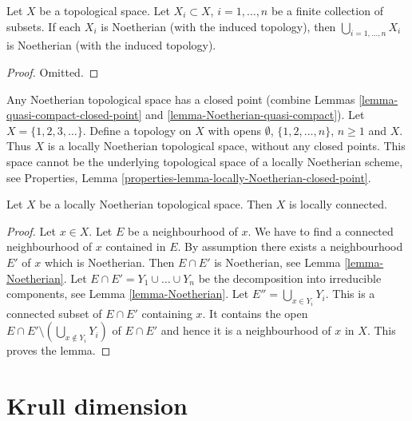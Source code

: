 \begin{lemma}
\label{lemma-finite-union-Noetherian}
Let $X$ be a topological space.
Let $X_i \subset X$, $i = 1, \ldots, n$ be a finite collection of subsets.
If each $X_i$ is Noetherian (with the induced topology), then
$\bigcup_{i = 1, \ldots, n}  X_i$ is Noetherian (with the induced topology).
\end{lemma}

\begin{proof}
Omitted.
\end{proof}

\begin{example}
\label{example-locally-Noetherian-no-closed-point}
Any Noetherian topological space has a closed point (combine
Lemmas \ref{lemma-quasi-compact-closed-point} and
\ref{lemma-Noetherian-quasi-compact}).
Let $X = \{1, 2, 3, \ldots \}$. Define a topology on $X$
with opens $\emptyset$, $\{1, 2, \ldots, n\}$, $n \geq 1$
and $X$. Thus $X$ is a locally Noetherian topological space,
without any closed points. This space cannot be the underlying
topological space of a locally Noetherian scheme, see
Properties, Lemma \ref{properties-lemma-locally-Noetherian-closed-point}.
\end{example}

\begin{lemma}
\label{lemma-locally-Noetherian-locally-connected}
Let $X$ be a locally Noetherian topological space.
Then $X$ is locally connected.
\end{lemma}

\begin{proof}
Let $x \in X$. Let $E$ be a neighbourhood of $x$.
We have to find a connected neighbourhood of $x$ contained
in $E$. By assumption there exists a neighbourhood $E'$ of $x$
which is Noetherian. Then $E \cap E'$ is Noetherian, see
Lemma \ref{lemma-Noetherian}.
Let $E \cap E' = Y_1 \cup \ldots \cup Y_n$ be the decomposition
into irreducible components, see
Lemma \ref{lemma-Noetherian}.
Let $E'' = \bigcup_{x \in Y_i} Y_i$. This is a connected
subset of $E \cap E'$ containing $x$. It contains the open
$E \cap E' \setminus (\bigcup_{x \not \in Y_i} Y_i)$ of $E \cap E'$
and hence it is a neighbourhood of $x$ in $X$. This proves the lemma.
\end{proof}



\section{Krull dimension}
\label{section-krull-dimension}

